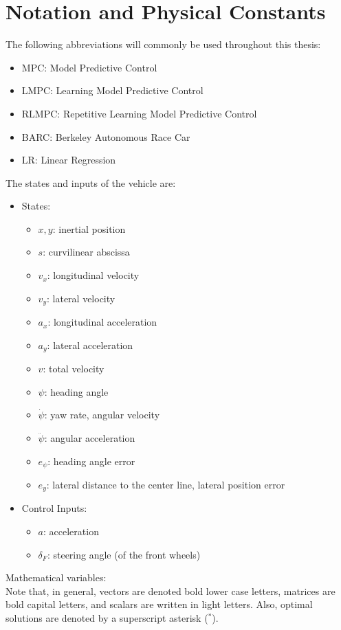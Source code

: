 \chapter*{Notation and Physical Constants}
The following abbreviations will commonly be used throughout this thesis:
\begin{itemize}
	\item MPC: Model Predictive Control
	\item LMPC: Learning Model Predictive Control
	\item RLMPC: Repetitive Learning Model Predictive Control
	\item BARC: Berkeley Autonomous Race Car
	\item LR: Linear Regression
\end{itemize}
The states and inputs of the vehicle are:
\begin{itemize}
	\item States:
	\begin{itemize}
		\item $x,y$: inertial position
		\item $s$: curvilinear abscissa
		\item $v_x$: longitudinal velocity
		\item $v_y$: lateral velocity
		\item $a_x$: longitudinal acceleration
		\item $a_y$: lateral acceleration
		\item $v$: total velocity
		\item $\psi$: heading angle
		\item $\dot \psi$: yaw rate, angular velocity
		\item $\ddot \psi$: angular acceleration
		\item $e_\psi$: heading angle error
		\item $e_y$: lateral distance to the center line, lateral position error
	\end{itemize}
	\item Control Inputs:
	\begin{itemize}
		\item $ a$: acceleration
		\item $\delta_F$: steering angle (of the front wheels)	
	\end{itemize}
\end{itemize}
Mathematical variables:\\
Note that, in general, vectors are denoted bold lower case letters, matrices are bold capital  letters, and scalars are written in light letters. Also, optimal solutions are denoted by a superscript asterisk ($^*$).
